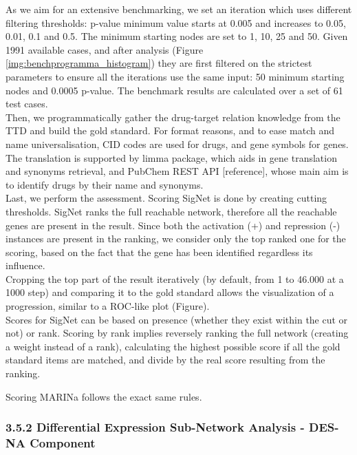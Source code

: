 As we aim for an extensive benchmarking, we set an iteration which uses different filtering thresholds: p-value minimum value starts at 0.005 and increases to 0.05, 0.01, 0.1 and 0.5. The minimum starting nodes are set to 1, 10, 25 and 50. Given 1991 available cases, and after analysis (Figure \ref{img:benchprogramma_histogram}) they are first filtered on the strictest parameters to ensure all the iterations use the same input: 50 minimum starting nodes and 0.0005 p-value. The benchmark results are calculated over a set of 61 test cases.
\\

Then, we programmatically gather the drug-target relation knowledge from the TTD and build the gold standard. For format reasons, and to ease match and name universalisation, CID codes are used for drugs, and gene symbols for genes. The translation is supported by limma package, which aids in gene translation and synonyms retrieval, and PubChem REST API [reference], whose main aim is to identify drugs by their name and synonyms.
\\

Last, we perform the assessment. Scoring SigNet is done by creating cutting thresholds. SigNet ranks the full reachable network, therefore all the reachable genes are present in the result. Since both the activation (+) and repression (-) instances are present in the ranking, we consider only the top ranked one for the scoring, based on the fact that the gene has been identified regardless its influence.
\\

Cropping the top part of the result iteratively (by default, from 1 to 46.000 at a 1000 step) and comparing it to the gold standard allows the visualization of a progression, similar to a ROC-like plot (Figure).
\\

Scores for SigNet can be based on presence (whether they exist within the cut or not) or rank. Scoring by rank implies reversely ranking the full network (creating a weight instead of a rank), calculating the highest possible score if all the gold standard items are matched, and divide by the real score resulting from the ranking.

Scoring MARINa follows the exact same rules.

\subsubsection{3.5.2 Differential Expression Sub-Network Analysis - DES-NA Component}

